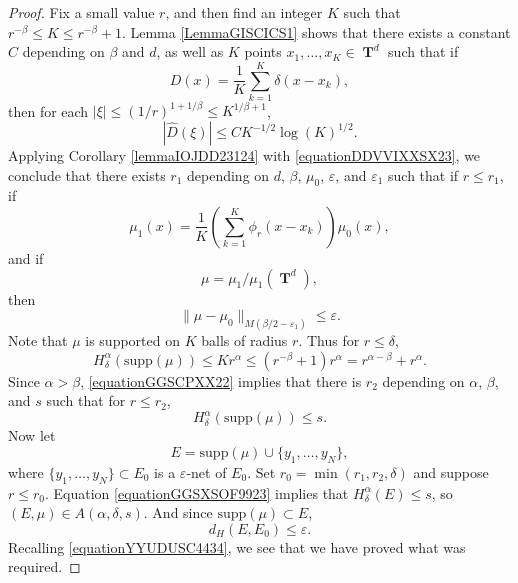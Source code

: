 \documentclass[12pt,reqno]{article}
\numberwithin{equation}{section}
\DeclareMathOperator{\TT}{\mathbf{T}}
\begin{document}
\begin{proof}
    Fix a small value $r$, and then find an integer $K$ such that $r^{-\beta} \leq K \leq r^{-\beta} + 1$. Lemma \ref{LemmaGISCICS1} shows that there exists a constant $C$ depending on $\beta$ and $d$, as well as $K$ points $x_1, \dots, x_K \in \TT^d$ such that if
    \[ D(x) = \frac{1}{K} \sum_{k = 1}^K \delta(x - x_k), \]
    then for each $|\xi| \leq (1/r)^{1 + 1/\beta} \leq K^{1/\beta + 1}$,
    \begin{equation} \label{equationDDVVIXXSX23}
        |\widehat{D}(\xi)| \leq C K^{-1/2} \log(K)^{1/2}.
    \end{equation}
    Applying Corollary \ref{lemmaIOJDD23124} with \eqref{equationDDVVIXXSX23}, we conclude that there exists $r_1$ depending on $d$, $\beta$, $\mu_0$, $\varepsilon$, and $\varepsilon_1$ such that if $r \leq r_1$, if
    \[ \mu_1(x) = \frac{1}{K} \left( \sum_{k = 1}^K \phi_{r}(x - x_k) \right) \mu_0(x), \]
    and if
    \[ \mu = \mu_1 / \mu_1(\TT^d), \]
    then
    \begin{equation} \label{equationYYUDUSC4434}
        \| \mu - \mu_0 \|_{M(\beta/2 - \varepsilon_1)} \leq \varepsilon.
    \end{equation}
    Note that $\mu$ is supported on $K$ balls of radius $r$. Thus for $r \leq \delta$,
    \begin{equation} \label{equationGGSCPXX22}
        H^\alpha_\delta(\text{supp}(\mu)) \leq K r^\alpha \leq (r^{-\beta} + 1) r^\alpha = r^{\alpha - \beta} + r^\alpha.
    \end{equation}
    Since $\alpha > \beta$, \eqref{equationGGSCPXX22} implies that there is $r_2$ depending on $\alpha$, $\beta$, and $s$ such that for $r \leq r_2$,
    \begin{equation} \label{equationGGSXSOF9923}
        H^\alpha_\delta(\text{supp}(\mu)) \leq s.
    \end{equation}
    Now let
    \[ E = \text{supp}(\mu) \cup \{ y_1, \dots, y_N \}, \]
    where $\{ y_1, \dots, y_N \} \subset E_0$ is a $\varepsilon$-net of $E_0$. Set $r_0 = \min(r_1,r_2, \delta)$ and suppose $r \leq r_0$. Equation \eqref{equationGGSXSOF9923} implies that $H^\alpha_\delta(E) \leq s$, so $(E,\mu) \in A(\alpha,\delta,s)$. And since $\text{supp}(\mu) \subset E$,
    \begin{equation} \label{equationGGISIICV222}
        d_H(E,E_0) \leq \varepsilon.
    \end{equation}
    Recalling \eqref{equationYYUDUSC4434}, we see that we have proved what was required.
\end{proof}
\end{document}
